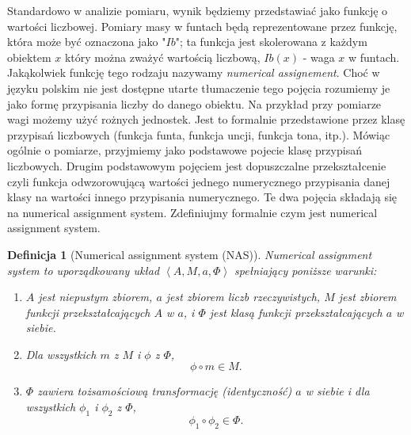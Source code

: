 \documentclass[12pt,a4paper]{report}
\newtheorem{definition}{Definicja}
\newcommand{\tuple}[1]{\left\langle {#1} \right\rangle}
\begin{document}
Standardowo w analizie pomiaru, wynik będziemy przedstawiać jako funkcję o wartości liczbowej. Pomiary masy w funtach będą reprezentowane przez funkcję, która może być oznaczona jako "$Ib$";  ta funkcja jest skolerowana z każdym obiektem $x$ który można zważyć wartością liczbową, $Ib(x)$ - waga $x$ w funtach. Jakąkolwiek funkcję tego rodzaju nazywamy \textit{numerical assignement}. Choć w języku polskim nie jest dostępne utarte tłumaczenie tego pojęcia rozumiemy je jako formę przypisania liczby do danego obiektu. Na przykład przy pomiarze wagi możemy użyć rożnych jednostek. Jest to formalnie przedstawione  przez klasę przypisań liczbowych (funkcja funta, funkcja uncji, funkcja tona, itp.). Mówiąc ogólnie o pomiarze, przyjmiemy jako podstawowe pojecie klasę przypisań liczbowych. Drugim podstawowym pojęciem jest dopuszczalne przekształcenie czyli funkcja odwzorowującą wartości jednego numerycznego przypisania danej klasy na wartości innego przypisania numerycznego. Te dwa pojęcia składają się na numerical assignment system. Zdefiniujmy formalnie czym jest numerical assignment system.
\begin{definition}[Numerical assignment system (NAS)]
Numerical assignment system to uporządkowany układ $\tuple{A, M, a, \Phi}$ spełniający poniższe warunki:
\begin{enumerate}
\item
$A$ jest niepustym zbiorem, $a$ jest zbiorem liczb rzeczywistych, $M$ jest zbiorem funkcji przekształcających $A$ w $a$, i $\Phi$ jest klasą funkcji przekształcających $a$ w siebie.  
\item
Dla wszystkich $m$ z $M$ i $\phi$ z $\Phi$, 
$$
\phi \circ m \in M.
$$ 
\item
$\Phi$ zawiera tożsamościową transformację (identyczność) $a$ w siebie i dla wszystkich $\phi_{1}$ i $\phi_{2}$ z $\Phi$, 
$$
\phi_{1} \circ \phi_{2} \in \Phi.
$$

\end{enumerate}

\end{definition}
\end{document}

